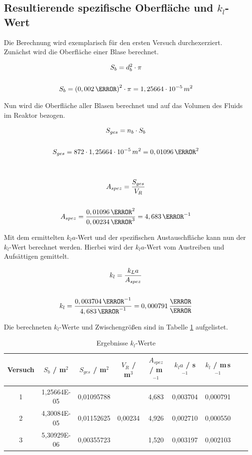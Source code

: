 \documentclass[12pt,liststotoc]{report}
\begin{document}
\subsection{Resultierende spezifische Oberfläche und $k_l$-Wert}

Die Berechnung wird exemplarisch für den ersten Versuch durchexerziert.\\
Zunächst wird die Oberfläche einer Blase berechnet.

\begin{gather}
    S_b = d_b^2\cdot \pi \\
    \notag\\
    S_b = \left(0,002\,\m\right)^2 \cdot \pi = 1,25664 \cdot 10^{-5}\,m^2\notag
\end{gather}

Nun wird die Oberfläche aller Blasen berechnet und auf das Volumen des Fluids im Reaktor bezogen.

\begin{gather}
    S_{ges} = n_b \cdot S_b\\
    \notag\\
    S_{ges} = 872 \cdot 1,25664 \cdot 10^{-5}\,m^2 = 0,01096\,\m^2\notag\\
    \notag\\
    \notag\\
    A_{spez} = \frac{S_{ges}}{V_R}\\
    \notag\\
    A_{spez} = \frac{0,01096\,\m^2}{0,00234\,\m^3} = 4,683\,\m^{-1}\notag
\end{gather}

Mit dem ermittelten $k_la$-Wert und der spezifischen Austauschfläche kann nun der $k_l$-Wert berechnet werden. Hierbei wird der $k_la$-Wert vom Austreiben und Aufsättigen gemittelt.

\begin{gather}
    k_l = \frac{k_La}{A_{spez}}\\
    \notag\\
    k_l = \frac{0,003704\,\s^{-1}}{4,683\,\m^{-1}} = 0,000791\,\frac{\m}{\s}
\end{gather}

Die berechneten $k_l$-Werte und Zwischengrößen sind in Tabelle \ref{tab:kl} aufgelistet.


\begin{table}[htbp]
  \centering
  \caption{Ergebnisse $k_l$-Werte}
    \begin{tabular}{ccccccccc}
    \toprule
    Versuch & $S_b$ / m$^2$ & $S_{ges}$ / m$^2$ & $V_R$ / m$^3$ & $A_{spez}$ / m$^{-1}$ & $k_la$ / s$^{-1}$   & $k_l$ / m\,s$^{-1}$\\
    \midrule
    1      & 1,25664E-05 & 0,01095788 & \multirow{3}[0]{*}{0,00234} & 4,683 & 0,003704 & 0,000791 \\
    2     &  4,30084E-05 & 0,01152625 &       & 4,926 & 0,002710 & 0,000550 \\
    3      & 5,30929E-06 & 0,00355723 &       & 1,520 & 0,003197 & 0,002103 \\
    \bottomrule
    \end{tabular}%
  \label{tab:kl}%
\end{table}%
\end{document}
